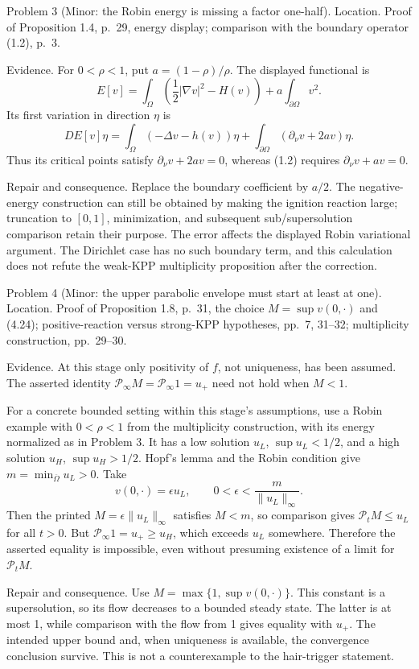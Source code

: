 \documentclass[10pt]{article}
\begin{document}
Problem 3 (Minor: the Robin energy is missing a factor one-half).  Location. Proof of Proposition 1.4, p. 29, energy display; comparison with the boundary operator (1.2), p. 3.\par
Evidence. For \(0<\rho<1\), put \(a=(1-\rho)/\rho\). The displayed functional is \[E[v]=\int_\Omega\left(\frac12|\nabla v|^2-H(v)\right)
       +a\int_{\partial\Omega}v^2.\] Its first variation in direction \(\eta\) is \[DE[v]\eta
 =\int_\Omega(-\Delta v-h(v))\eta
   +\int_{\partial\Omega}(\partial_\nu v+2av)\eta .\] Thus its critical points satisfy \(\partial_\nu v+2av=0\), whereas (1.2) requires \(\partial_\nu v+av=0\).\par
Repair and consequence. Replace the boundary coefficient by \(a/2\). The negative-energy construction can still be obtained by making the ignition reaction large; truncation to \([0,1]\), minimization, and subsequent sub/supersolution comparison retain their purpose. The error affects the displayed Robin variational argument. The Dirichlet case has no such boundary term, and this calculation does not refute the weak-KPP multiplicity proposition after the correction.\par
Problem 4 (Minor: the upper parabolic envelope must start at least at one).  Location. Proof of Proposition 1.8, p. 31, the choice \(M=\sup v(0,\cdot)\) and (4.24); positive-reaction versus strong-KPP hypotheses, pp. 7, 31–32; multiplicity construction, pp. 29–30.\par
Evidence. At this stage only positivity of \(f\), not uniqueness, has been assumed. The asserted identity \(\mathcal P_\infty M=\mathcal P_\infty1=u_+\) need not hold when \(M<1\).\par
For a concrete bounded setting within this stage’s assumptions, use a Robin example with \(0<\rho<1\) from the multiplicity construction, with its energy normalized as in Problem 3. It has a low solution \(u_L\), \(\sup u_L<1/2\), and a high solution \(u_H\), \(\sup u_H>1/2\). Hopf’s lemma and the Robin condition give \(m=\min_{\overline\Omega}u_L>0\). Take \[v(0,\cdot)=\epsilon u_L,\qquad
 0<\epsilon<\frac{m}{\|u_L\|_\infty}.\] Then the printed \(M=\epsilon\|u_L\|_\infty\) satisfies \(M<m\), so comparison gives \(\mathcal P_t M\le u_L\) for all \(t>0\). But \(\mathcal P_\infty1=u_+\ge u_H\), which exceeds \(u_L\) somewhere. Therefore the asserted equality is impossible, even without presuming existence of a limit for \(\mathcal P_tM\).\par
Repair and consequence. Use \(M=\max\{1,\sup v(0,\cdot)\}\). This constant is a supersolution, so its flow decreases to a bounded steady state. The latter is at most 1, while comparison with the flow from 1 gives equality with \(u_+\). The intended upper bound and, when uniqueness is available, the convergence conclusion survive. This is not a counterexample to the hair-trigger statement.\par
\end{document}
